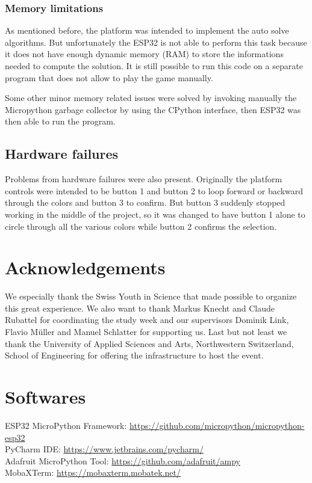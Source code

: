 \documentclass[a4paper, 12pt]{article}
\begin{document}
\subsubsection{Memory limitations}
As mentioned before, the platform was intended to implement the auto solve
algorithms. But unfortunately the ESP32 is not able to perform this task
because it does not have enough dynamic memory (RAM) to store the informations
needed to compute the solution. It is still possible to run this code on a
separate program that does not allow to play the game manually.

Some other minor memory related issues were solved by invoking manually the
Micropython garbage collector by using the CPython interface, then ESP32 was
then able to run the program.

\subsection{Hardware failures}
Problems from hardware failures were also present. Originally the
platform controls were intended to be button 1 and button 2 to loop
forward or backward through the colors and button 3 to confirm. But
button 3 suddenly stopped working in the middle of the project, so it
was changed to have button 1 alone to circle through all the various
colors while button 2 confirms the selection.

\section{Acknowledgements}
We especially thank the Swiss Youth in Science that made possible to
organize this great experience. We also want to thank Markus Knecht and
Claude Rubattel for coordinating the study week and our supervisors
Dominik Link, Flavio Müller and Manuel Schlatter for supporting us. Last
but not least we thank the University of Applied Sciences and Arts,
Northwestern Switzerland, School of Engineering for offering the
infrastructure to host the event.

\section*{Softwares}
ESP32 MicroPython Framework: \url{https://github.com/micropython/micropython-esp32} \\
PyCharm IDE: \url{https://www.jetbrains.com/pycharm/} \\
Adafruit MicroPython Tool: \url{https://github.com/adafruit/ampy} \\
MobaXTerm: \url{https://mobaxterm.mobatek.net/}
\end{document}
